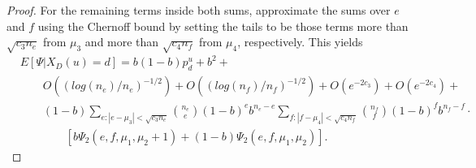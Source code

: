 \documentclass[prodmode,acmtissec]{acmsmall}
\begin{document}
\begin{proof}
For the remaining terms inside both sums, approximate the sums over $e$ and $f$ using the Chernoff bound by setting the tails to be those terms more than $\sqrt{c_3 n_e}$ from $\mu_3$ and more than $\sqrt{c_4 n_f}$ from $\mu_4$, respectively. This yields
\begin{equation} \label{eq:yasymp3}
\begin{split}
  &E[\Psi | X_D(u)=d] = b(1-b)p^u_d + b^2 +\\
  &\qquad O\left( \left( log(n_e)/n_e \right)^{-1/2} \right) + O\left( \left( log(n_f)/n_f \right)^{-1/2} \right) + O\left( e^{-2 c_3} \right) + O\left( e^{-2 c_4} \right) + \\
  &\qquad (1-b) \sum_{e: |e-\mu_3|<\sqrt{c_3 n_e}} \binom{n_e}{e} (1-b)^e b^{n_e-e} \sum_{f: |f-\mu_4| < \sqrt{c_4 n_f}} \binom{n_f}{f} (1-b)^f b^{n_f-f} \cdot\\
  &\qquad \qquad \left[ b \Psi_2(e,f,\mu_1,\mu_2+1) + (1-b)\Psi_2(e,f,\mu_1,\mu_2) \right].
\end{split}
\end{equation}


\end{proof}
\end{document}

